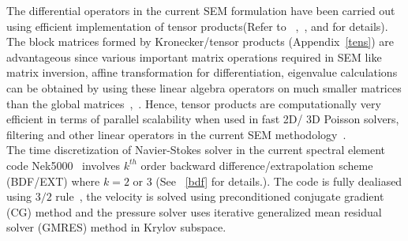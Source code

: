 \par
The differential operators in the current SEM formulation
have been carried out using efficient implementation of tensor products(Refer to ~\cite{lynch},~\cite{orz},\cite{deville} and for details).
The block matrices formed by Kronecker/tensor products (Appendix~\ref{tens}) are advantageous since various important matrix operations required in SEM like matrix inversion, affine transformation for differentiation, eigenvalue calculations can be obtained by using these linear algebra operators on much smaller matrices than the global matrices~\cite{lynch},~\cite{deville}. Hence, tensor products are computationally very efficient in terms of parallel scalability when used in fast 2D/ 3D Poisson solvers, filtering and other linear operators in the current SEM methodology~\cite{erik}.\\

The time discretization of Navier-Stokes solver in the current spectral element code Nek5000~\cite{nek5000} involves $k^{th}$ order backward difference/extrapolation scheme (BDF/EXT) where $k = 2$ or $3$ (See ~\ref{bdf} for details.). The code is fully dealiased using $3/2$ rule~\cite{orz2,canuto}, the velocity  is solved using preconditioned conjugate gradient (CG) method and the pressure solver uses iterative generalized mean residual solver (GMRES) method in Krylov subspace.

